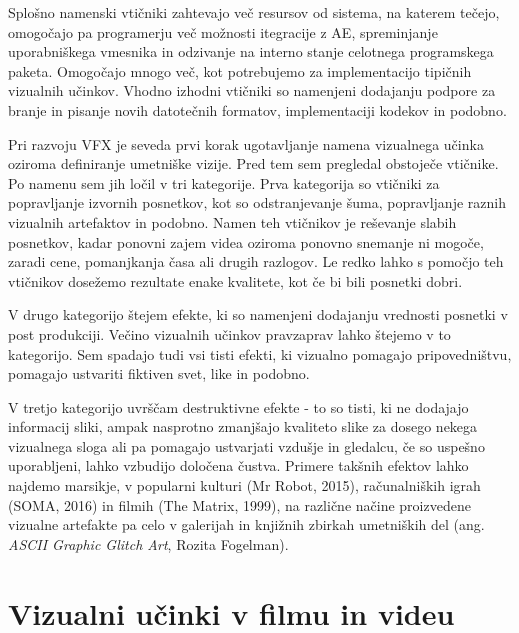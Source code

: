 \documentclass[a4paper, 12pt]{book}
\begin{document}
Splošno namenski vtičniki zahtevajo več resursov od sistema, na katerem tečejo, omogočajo pa programerju več možnosti itegracije z AE, spreminjanje uporabniškega vmesnika in odzivanje na interno stanje celotnega programskega paketa. 
Omogočajo mnogo več, kot potrebujemo za implementacijo tipičnih vizualnih učinkov. 
Vhodno izhodni vtičniki so namenjeni dodajanju podpore za branje in pisanje novih datotečnih formatov, implementaciji kodekov in podobno.

Pri razvoju VFX je seveda prvi korak ugotavljanje namena vizualnega učinka oziroma definiranje umetniške vizije. 
Pred tem sem pregledal obstoječe vtičnike. 
Po namenu sem jih ločil v tri kategorije. 
Prva kategorija so vtičniki za popravljanje izvornih posnetkov, kot so odstranjevanje šuma, popravljanje raznih vizualnih artefaktov in podobno. 
Namen teh vtičnikov je reševanje slabih posnetkov, kadar ponovni zajem videa oziroma ponovno snemanje ni mogoče, zaradi cene, pomanjkanja časa ali drugih razlogov. 
Le redko lahko s pomočjo teh vtičnikov dosežemo rezultate enake kvalitete, kot če bi bili posnetki dobri. 

V drugo kategorijo štejem efekte, ki so namenjeni dodajanju vrednosti posnetki v post produkciji. 
Večino vizualnih učinkov pravzaprav lahko štejemo v to kategorijo. 
Sem spadajo tudi vsi tisti efekti, ki vizualno pomagajo pripovedništvu, pomagajo ustvariti fiktiven svet, like in podobno. 

V tretjo kategorijo uvrščam destruktivne efekte - to so tisti, ki ne dodajajo informacij sliki, ampak nasprotno zmanjšajo kvaliteto slike za dosego nekega vizualnega sloga ali pa pomagajo ustvarjati vzdušje in gledalcu, če so uspešno uporabljeni, lahko vzbudijo določena čustva. 
Primere takšnih efektov lahko najdemo marsikje, v popularni kulturi (Mr Robot, 2015), %
računalniških igrah (SOMA, 2016) %
 in filmih (The Matrix, 1999), %
na različne načine proizvedene vizualne artefakte pa celo v galerijah in knjižnih zbirkah umetniških del (ang. {\it ASCII Graphic Glitch Art}, Rozita Fogelman).



\chapter{Vizualni učinki v filmu in videu}
\end{document}
